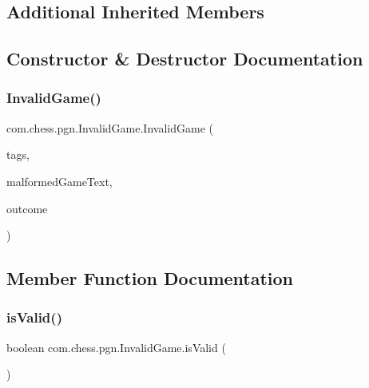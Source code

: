 \subsection*{Additional Inherited Members}


\subsection{Constructor \& Destructor Documentation}
\mbox{\label{classcom_1_1chess_1_1pgn_1_1_invalid_game_af9e0ecfb14cc767a6b581531ae79e88f}} 
\subsubsection{\texorpdfstring{InvalidGame()}{InvalidGame()}}
{\footnotesize\ttfamily com.\+chess.\+pgn.\+Invalid\+Game.\+Invalid\+Game (\begin{DoxyParamCaption}\item[{final \mbox{\hyperlink{classcom_1_1chess_1_1pgn_1_1_p_g_n_game_tags}{P\+G\+N\+Game\+Tags}}}]{tags,  }\item[{final String}]{malformed\+Game\+Text,  }\item[{final String}]{outcome }\end{DoxyParamCaption})}



\subsection{Member Function Documentation}
\mbox{\label{classcom_1_1chess_1_1pgn_1_1_invalid_game_a482beca1cd8dabe2189a4fb82ec31020}} 
\subsubsection{\texorpdfstring{isValid()}{isValid()}}
{\footnotesize\ttfamily boolean com.\+chess.\+pgn.\+Invalid\+Game.\+is\+Valid (\begin{DoxyParamCaption}{ }\end{DoxyParamCaption})}



